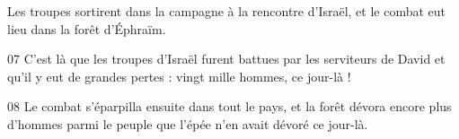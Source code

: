 Les troupes sortirent dans la campagne à la rencontre d’Israël, et le combat eut lieu dans la forêt d’Éphraïm.

07 C’est là que les troupes d’Israël furent battues par les serviteurs de David et qu’il y eut de grandes pertes : vingt mille hommes, ce jour-là !

08 Le combat s’éparpilla ensuite dans tout le pays, et la forêt dévora encore plus d’hommes parmi le peuple que l’épée n’en avait dévoré ce jour-là.
